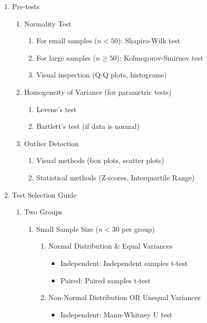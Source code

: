 \documentclass{article}
\begin{document}
\begin{enumerate}
    \item Pre-tests
    \begin{enumerate}
    \item Normality Test
    \begin{enumerate}
    \item For small samples ($n < 50$): Shapiro-Wilk test
    \item For large samples ($n \geq 50$): Kolmogorov-Smirnov test
    \item Visual inspection (Q-Q plots, histograms)
    \end{enumerate}
    \item Homogeneity of Variance (for parametric tests)
    \begin{enumerate}
    \item Levene's test
    \item Bartlett's test (if data is normal)
    \end{enumerate}
    \item Outlier Detection
    \begin{enumerate}
    \item Visual methods (box plots, scatter plots)
    \item Statistical methods (Z-scores, Interquartile Range)
    \end{enumerate}
    \end{enumerate}
    \item Test Selection Guide
    \begin{enumerate}
        \item Two Groups
        \begin{enumerate}
            \item Small Sample Size ($n < 30$ per group)
            \begin{enumerate}
                \item Normal Distribution \& Equal Variances
                \begin{itemize}
                    \item Independent: Independent samples t-test
                    \item Paired: Paired samples t-test
                \end{itemize}
                \item Non-Normal Distribution OR Unequal Variances
                \begin{itemize}
                    \item Independent: Mann-Whitney U test

\end{itemize}
\end{enumerate}
\end{enumerate}
\end{enumerate}
\end{enumerate}
\end{document}
